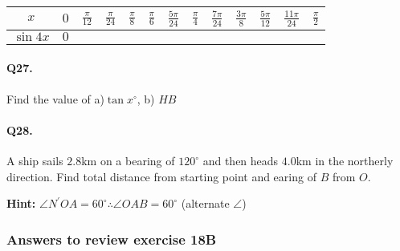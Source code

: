 \documentclass{article}
\begin{document}
\begin{tabular}{|c|c|c|c|c|c|c|c|c|c|c|c|c|}
  \hline
  $x$ & $0$ & $\frac{\pi}{12}$ & $\frac{\pi}{24}$ & $\frac{\pi}{8}$ & $\frac{\pi}{6}$ & $\frac{5\pi}{24}$ & $\frac{\pi}{4}$ & $\frac{7\pi}{24}$ & $\frac{3\pi}{8}$ & $\frac{5\pi}{12}$ & $\frac{11\pi}{24}$ & $\frac{\pi}{2}$ \\[3pt]
  \hline
$\sin 4x$ & $0$ & & & & & & & & & & &\\
  \hline
\end{tabular}

\paragraph{Q27.}
Find the value of a)$\tan x^{\circ}$, b) $HB$

\paragraph{Q28.}
A ship sails $2.8$km on a bearing of $120^{\circ}$ and then heads $4.0$km in the northerly direction. Find total distance from starting point and earing of $B$ from $O$.

{\scriptsize \textbf{Hint:}}
$\angle N^{'}OA = 60^{\circ} \therefore \angle OAB = 60^{\circ}$ (alternate $\angle$)

\subsubsection {Answers to review exercise 18B}
\end{document}
